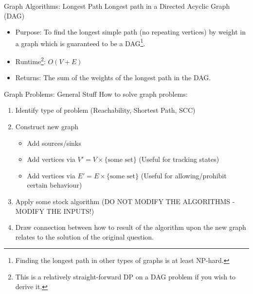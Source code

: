 \documentclass{beamer}
\begin{document}
\begin{frame}[t]{Graph Algorithms: Longest Path}
  \alert{Longest path in a Directed Acyclic Graph (DAG)}
  \begin{itemize}
      \item \alert{Purpose:} To find the longest simple path (no repeating vertices) by weight in a graph which is guaranteed to be a DAG\footnote{Finding the longest path in other types of graphs is at least NP-hard.}.
      \item \alert{Runtime\footnote{This is a relatively straight-forward DP on a DAG problem if you wish to derive it.}:} $O(V + E)$
      \item \alert{Returns:} The sum of the weights of the longest path in the DAG.
  \end{itemize}
\end{frame}

\begin{frame}[t]{Graph Problems: General Stuff}
  \alert{How to solve graph problems:}
  \begin{enumerate}
        \item Identify type of problem (Reachability, Shortest Path, SCC)
        \item Construct new graph
        \begin{itemize}
            \item Add sources/sinks
            \item Add vertices via $V' = V \times \{\text{some set}\}$ (Useful for tracking states)
            \item Add vertices via $E' = E \times \{\text{some set}\}$ (Useful for allowing/prohibit certain behaviour)
        \end{itemize}
        \item Apply some stock algorithm \alert{(DO NOT MODIFY THE ALGORITHMS - MODIFY THE INPUTS!)}
        \item Draw connection between how to result of the algorithm upon the new graph relates to the solution of the original question.
  \end{enumerate}
\end{frame}
\end{document}
